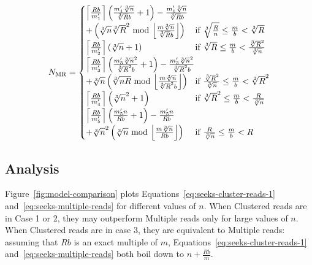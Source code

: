 \documentclass[10pt, conference, compsocconf]{IEEEtran}
\DeclarePairedDelimiter{\ceil}{\lceil}{\rceil}
\DeclarePairedDelimiter{\floor}{\lfloor}{\rfloor}
\newcommand{\todo}[1]{\marginpar{\parbox{18mm}{\flushleft\tiny\color{red}\textbf{TODO}:
      #1}}}
\begin{document}
\begin{equation}
N_\mathrm{MR} =
\begin{cases}
  \ceil*{\frac{Rb}{m_1'}}\left(\frac{m_1'\sqrt[3]{n}}{\sqrt[3]{R}b}+1\right)-\frac{m_1'\sqrt[3]{n}}{\sqrt[3]{R}b}\\[0.4em]
   +\left( \sqrt[3]{n}\sqrt[3]{R}^2 \text{ mod }\floor*{\frac{m\sqrt[3]{n}}{\sqrt[3]{R}b}}\right)\
  & \text{\hspace*{-0.9em}if } \sqrt[3]{\frac{R}{n}} \leq \frac{m}{b} < \sqrt[3]{R}\\[0.4em]

  \ceil*{\frac{Rb}{m_2'}}\left(\sqrt[3]{n}+1\right)\
  & \text{\hspace*{-0.9em}if } \sqrt[3]{R} \leq \frac{m}{b} < \frac{\sqrt[3]{R}^2}{\sqrt[3]{n}}\\[0.4em]

  \ceil*{\frac{Rb}{m_3'}}\left(\frac{m'_3\sqrt[3]{n}^2}{\sqrt[3]{R}^2b}+1\right)-\frac{m'_3\sqrt[3]{n}^2}{\sqrt[3]{R}^2b}\\[0.4em]
  +\sqrt[3]{n}\left( \sqrt[3]{nR} \text{ mod } \floor*{\frac{m\sqrt[3]{n}}{\sqrt[3]{R}^2b}} \right)
  & \text{\hspace*{-0.9em}if } \frac{\sqrt[3]{R}^2}{\sqrt[3]{n}} \leq \frac{m}{b} < \sqrt[3]{R}^2\\[0.4em]

  \ceil*{\frac{Rb}{m_4'}}\left(\sqrt[3]{n}^2+1\right)\
  & \text{\hspace*{-0.9em}if } \sqrt[3]{R}^2 \leq \frac{m}{b} < \frac{R}{\sqrt[3]{n}}\\[0.4em]

  \ceil*{\frac{Rb}{m_5'}}\left(\frac{m_5'n}{Rb}+1\right)-\frac{m_5'n}{Rb}\\[0.4em]
  +\sqrt[3]{n}^2\left( \sqrt[3]{n} \text{ mod } \floor*{\frac{m\sqrt[3]{n}}{Rb}}\right)
  & \text{\hspace*{-0.9em}if } \frac{R}{\sqrt[3]{n}} \leq \frac{m}{b} < R
\end{cases} \label{eq:seeks-multiple-reads}
\end{equation}

\subsection{Analysis}
\label{sec:analysis}

Figure~\ref{fig:model-comparison} plots
Equations~\ref{eq:seeks-cluster-reads-1}
and~\ref{eq:seeks-multiple-reads} for different values of $n$. When
Clustered reads are in Case 1 or 2, they may outperform Multiple reads
only for large values of $n$. When Clustered reads are in case 3, they
are equivalent to Multiple reads: assuming that $Rb$ is an exact
multiple of $m$, Equations~\ref{eq:seeks-cluster-reads-1}
and~\ref{eq:seeks-multiple-reads} both boil down to $n+\frac{Rb}{m}$.
\end{document}
